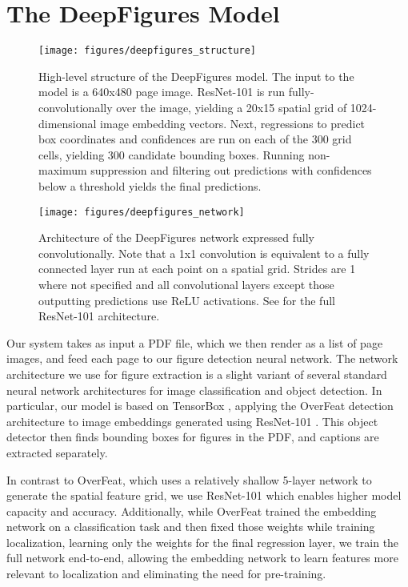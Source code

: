 \documentclass[sigconf]{acmart}
\begin{document}
\section{The DeepFigures Model}\label{sec:model}\begin{figure*}
\texttt{[image: figures/deepfigures\_structure]}
\caption{High-level structure of the DeepFigures model. The input to the model is a 640x480 page image. ResNet-101 is run fully-convolutionally over the image, yielding a 20x15 spatial grid of 1024-dimensional image embedding vectors. Next, regressions to predict box coordinates and confidences are run on each of the 300 grid cells, yielding 300 candidate bounding boxes. Running non-maximum suppression and filtering out predictions with confidences below a threshold yields the final predictions.}
\label{fig:structure}
\end{figure*}\begin{figure}
\texttt{[image: figures/deepfigures\_network]}
\caption{Architecture of the DeepFigures network expressed fully convolutionally. Note that a 1x1 convolution is equivalent to a fully connected layer run at each point on a spatial grid. Strides are 1 where not specified and all convolutional layers except those outputting predictions use ReLU activations. See \cite{resnet} for the full ResNet-101 architecture.}
\label{fig:network}
\end{figure}

Our system takes as input a PDF file, which we then render as a list of page images, and feed each page to our figure detection neural network. 
The network architecture we use for figure extraction is a slight variant of several standard neural network architectures for image classification and object detection. In particular, our model is based on TensorBox \cite{tensorbox}, applying the OverFeat detection architecture \cite{overfeat} to image embeddings generated using ResNet-101 \cite{resnet}. This object detector then finds bounding boxes for figures in the PDF, and captions are extracted separately. 

In contrast to OverFeat, which uses a relatively shallow 5-layer network to generate the spatial feature grid, we use ResNet-101 which enables higher model capacity and accuracy. Additionally, while OverFeat trained the embedding network on a classification task and then fixed those weights while training localization, learning only the weights for the final regression layer, we train the full network end-to-end, allowing the embedding network to learn features more relevant to localization and eliminating the need for pre-training. 
\end{document}
